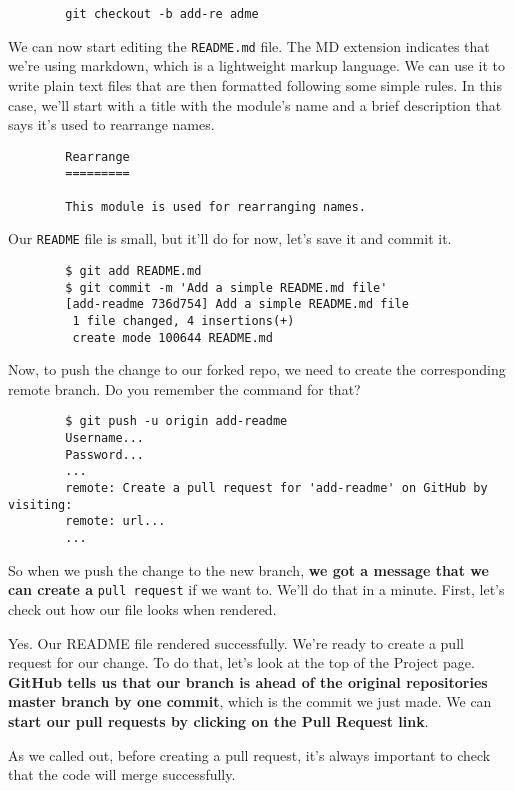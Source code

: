 	\begin{verbatim}
		git checkout -b add-re adme
	\end{verbatim}
	
	We can now start editing the \verb|README.md| file. The MD extension indicates that we're using markdown, which is a lightweight markup language. We can use it to write plain text files that are then formatted following some simple rules. In this case, we'll start with a title with the module's name and a brief description that says it's used to rearrange names.
	
	\begin{verbatim}
		Rearrange
		=========
		
		This module is used for rearranging names.	
	\end{verbatim}
	
	Our \texttt{README} file is small, but it'll do for now, let's save it and commit it.
	
	\begin{verbatim}
		$ git add README.md
		$ git commit -m 'Add a simple README.md file'
		[add-readme 736d754] Add a simple README.md file
		 1 file changed, 4 insertions(+)
		 create mode 100644 README.md
	\end{verbatim}
	
	Now, to push the change to our forked repo, we need to create the corresponding remote branch. Do you remember the command for that? 
	
	\begin{verbatim}
		$ git push -u origin add-readme
		Username...
		Password...
		...
		remote: Create a pull request for 'add-readme' on GitHub by visiting:
		remote: url...
		...
	\end{verbatim}
	
	
	So when we push the change to the new branch, \textbf{we got a message that we can create a} \texttt{pull request} if we want to. We'll do that in a minute. First, let's check out how our file looks when rendered.
	
	Yes. Our README file rendered successfully. We're ready to create a pull request for our change. To do that, let's look at the top of the Project page. \textbf{GitHub tells us that our branch is ahead of the original repositories master branch by one commit}, which is the commit we just made. We can \textbf{start our pull requests by clicking on the Pull Request link}.
	
	As we called out, before creating a pull request, it's always important to check that the code will merge successfully. 
	
